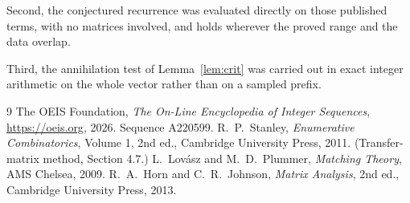 \documentclass[11pt,a4paper]{article}
\theoremstyle{plain}
\theoremstyle{definition}
\begin{document}
Second, the conjectured recurrence was evaluated directly on those published terms, with no
matrices involved, and holds wherever the proved range and the data overlap.

Third, the annihilation test of Lemma~\ref{lem:crit} was carried out in exact integer
arithmetic on the whole vector rather than on a sampled prefix.

\begin{thebibliography}{9}
 The OEIS Foundation, \emph{The On-Line Encyclopedia of Integer
Sequences}, \url{https://oeis.org}, 2026. Sequence A220599.
 R.~P.~Stanley, \emph{Enumerative Combinatorics}, Volume 1, 2nd ed.,
Cambridge University Press, 2011. (Transfer-matrix method, Section 4.7.)
 L.~Lov\'asz and M.~D.~Plummer, \emph{Matching Theory}, AMS Chelsea,
2009.
 R.~A.~Horn and C.~R.~Johnson, \emph{Matrix Analysis}, 2nd ed., Cambridge
University Press, 2013.
\end{thebibliography}
\end{document}
